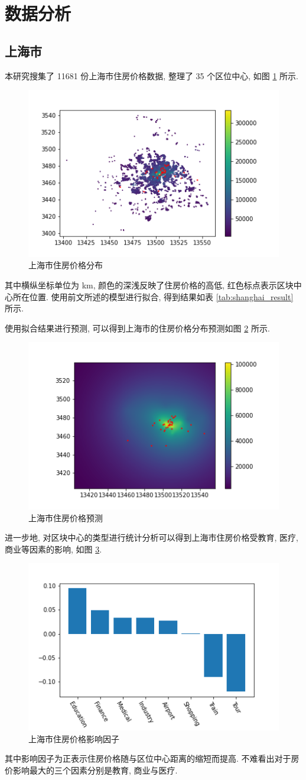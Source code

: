 \section{数据分析}
\subsection{上海市}

本研究搜集了 11681 份上海市住房价格数据, 整理了 35 个区位中心, 如图 \ref{fig:shanghai} 所示.

\begin{figure}[H]
  \centering
  \includegraphics[width=.5\linewidth]{shanghai/shanghai.png}
  \caption{上海市住房价格分布} \label{fig:shanghai}
\end{figure}

其中横纵坐标单位为 \si{\kilo\metre}, 颜色的深浅反映了住房价格的高低, 红色标点表示区块中心所在位置.
使用前文所述的模型进行拟合, 得到结果如表 \ref{tab:shanghai_result} 所示.

使用拟合结果进行预测, 可以得到上海市的住房价格分布预测如图 \ref{fig:shanghai_predict} 所示.

\begin{figure}[H]
  \centering
  \includegraphics[width=.5\linewidth]{shanghai/shanghai_predict.png}
  \caption{上海市住房价格预测}
  \label{fig:shanghai_predict}
\end{figure}

进一步地, 对区块中心的类型进行统计分析可以得到上海市住房价格受教育, 医疗, 商业等因素的影响, 如图 \ref{fig:shanghai_impact}.

\begin{figure}[H]
  \centering
  \includegraphics[width=.5\linewidth]{shanghai/shanghai_impact.png}
  \caption{上海市住房价格影响因子}
  \label{fig:shanghai_impact}
\end{figure}

其中影响因子为正表示住房价格随与区位中心距离的缩短而提高.
不难看出对于房价影响最大的三个因素分别是教育, 商业与医疗.
